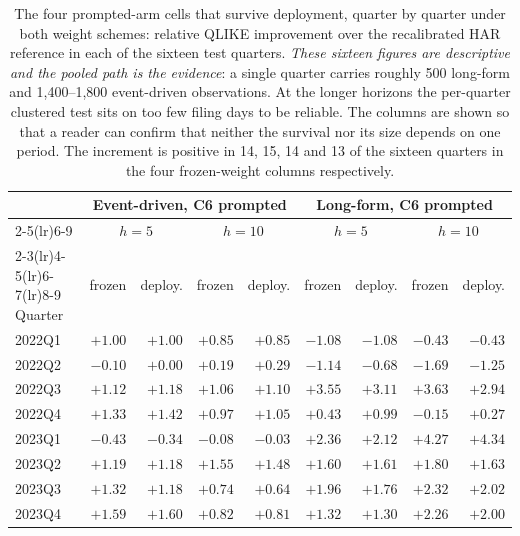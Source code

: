 \begin{table}[htbp]
\centering
\caption[The prompted arm quarter by quarter, both weight schemes]{The four
prompted-arm cells that survive deployment, quarter by quarter under both
weight schemes: relative QLIKE improvement over the recalibrated HAR
reference in each of the sixteen test quarters. \emph{These sixteen figures
are descriptive and the pooled path is the evidence}: a single quarter
carries roughly 500 long-form and 1{,}400--1{,}800 event-driven
observations. At the longer horizons the per-quarter clustered test
sits on too few filing days to be reliable. The columns are shown so that a
reader can confirm that neither the survival nor its size depends on one
period. The increment is positive in 14, 15, 14 and 13 of the sixteen
quarters in the four frozen-weight columns respectively.}
\label{tab:app-deploy-quarters}
\singlespacing\small
\setlength{\tabcolsep}{4pt}
\begin{tabular}{@{}lrrrrrrrr@{}}
\toprule
& \multicolumn{4}{c}{Event-driven, C6 prompted} & \multicolumn{4}{c}{Long-form, C6 prompted} \\
\cmidrule(lr){2-5}\cmidrule(lr){6-9}
& \multicolumn{2}{c}{$h{=}5$} & \multicolumn{2}{c}{$h{=}10$} & \multicolumn{2}{c}{$h{=}5$} & \multicolumn{2}{c}{$h{=}10$} \\
\cmidrule(lr){2-3}\cmidrule(lr){4-5}\cmidrule(lr){6-7}\cmidrule(lr){8-9}
Quarter & frozen & deploy. & frozen & deploy. & frozen & deploy. & frozen & deploy. \\
\midrule
2022Q1 & $+1.00$ & $+1.00$ & $+0.85$ & $+0.85$ & $-1.08$ & $-1.08$ & $-0.43$ & $-0.43$ \\
2022Q2 & $-0.10$ & $+0.00$ & $+0.19$ & $+0.29$ & $-1.14$ & $-0.68$ & $-1.69$ & $-1.25$ \\
2022Q3 & $+1.12$ & $+1.18$ & $+1.06$ & $+1.10$ & $+3.55$ & $+3.11$ & $+3.63$ & $+2.94$ \\
2022Q4 & $+1.33$ & $+1.42$ & $+0.97$ & $+1.05$ & $+0.43$ & $+0.99$ & $-0.15$ & $+0.27$ \\
2023Q1 & $-0.43$ & $-0.34$ & $-0.08$ & $-0.03$ & $+2.36$ & $+2.12$ & $+4.27$ & $+4.34$ \\
2023Q2 & $+1.19$ & $+1.18$ & $+1.55$ & $+1.48$ & $+1.60$ & $+1.61$ & $+1.80$ & $+1.63$ \\
2023Q3 & $+1.32$ & $+1.18$ & $+0.74$ & $+0.64$ & $+1.96$ & $+1.76$ & $+2.32$ & $+2.02$ \\
2023Q4 & $+1.59$ & $+1.60$ & $+0.82$ & $+0.81$ & $+1.32$ & $+1.30$ & $+2.26$ & $+2.00$ \\

\end{tabular}
\end{table}
